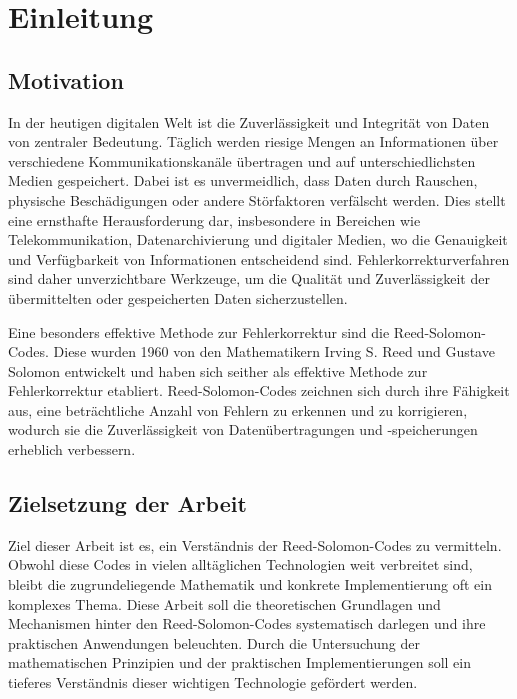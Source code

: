 \chapter{Einleitung}\label{ch:intro}

\section{Motivation}\label{sec:motivation}

In der heutigen digitalen Welt ist die Zuverlässigkeit und Integrität von Daten von zentraler Bedeutung. 
Täglich werden riesige Mengen an Informationen über verschiedene Kommunikationskanäle übertragen und auf unterschiedlichsten Medien gespeichert. 
Dabei ist es unvermeidlich, dass Daten durch Rauschen, physische Beschädigungen oder andere Störfaktoren verfälscht werden. 
Dies stellt eine ernsthafte Herausforderung dar, insbesondere in Bereichen wie Telekommunikation, Datenarchivierung und digitaler Medien, wo die Genauigkeit und Verfügbarkeit von Informationen entscheidend sind.
Fehlerkorrekturverfahren sind daher unverzichtbare Werkzeuge, um die Qualität und Zuverlässigkeit der übermittelten oder gespeicherten Daten sicherzustellen.

Eine besonders effektive Methode zur Fehlerkorrektur sind die Reed-Solomon-Codes.
Diese wurden 1960 von den Mathematikern Irving S. Reed und Gustave Solomon entwickelt und haben sich seither als effektive Methode zur Fehlerkorrektur etabliert. 
Reed-Solomon-Codes zeichnen sich durch ihre Fähigkeit aus, eine beträchtliche Anzahl von Fehlern zu erkennen und zu korrigieren, wodurch sie die Zuverlässigkeit von Datenübertragungen und -speicherungen erheblich verbessern.

\section{Zielsetzung der Arbeit}\label{sec:objective}

Ziel dieser Arbeit ist es, ein Verständnis der Reed-Solomon-Codes zu vermitteln. 
Obwohl diese Codes in vielen alltäglichen Technologien weit verbreitet sind, bleibt die zugrundeliegende Mathematik und konkrete Implementierung oft ein komplexes Thema. 
Diese Arbeit soll die theoretischen Grundlagen und Mechanismen hinter den Reed-Solomon-Codes systematisch darlegen und ihre praktischen Anwendungen beleuchten. 
Durch die Untersuchung der mathematischen Prinzipien und der praktischen Implementierungen soll ein tieferes Verständnis dieser wichtigen Technologie gefördert werden.

